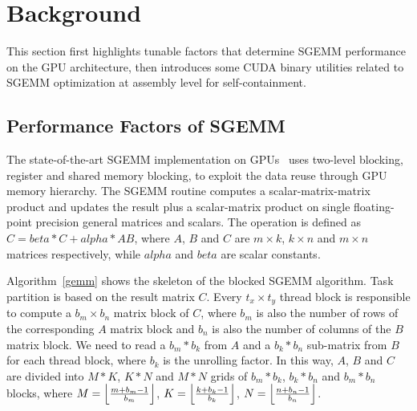 \section{Background}
\label{sec:background}

This section first highlights tunable factors that determine SGEMM performance on the GPU architecture, then introduces some CUDA binary utilities related to SGEMM optimization at assembly level for self-containment. 


\subsection{Performance Factors of SGEMM}
\label{sec:sgemm}
The state-of-the-art SGEMM implementation on GPUs~\cite{magma,nervana_sgemm_wiki,lai,tan} uses two-level blocking,
register and shared memory blocking, to exploit the data reuse through GPU memory hierarchy.
The SGEMM routine computes a scalar-matrix-matrix product and updates the result plus
a scalar-matrix product on single floating-point precision general matrices and scalars. 
The operation is defined as $C
= beta*C + alpha*AB$, where $A$, $B$ and $C$ are $m\times k$, $k\times n$ and
$m\times n$ matrices respectively, while $alpha$ and $beta$ are scalar constants.

Algorithm~\ref{gemm} shows the skeleton of the blocked SGEMM algorithm. 
Task partition is based on the result matrix $C$. 
Every $t_x \times t_y$ thread block is responsible to compute a $b_m \times b_n$ matrix block of $C$, where $b_m$ is also the number of rows of the corresponding $A$ matrix block and $b_n$ is also the  
number of columns of the $B$ matrix block. 
We need to read a $b_m*b_k$ from $A$ and a $b_k*b_n$ sub-matrix from 
$B$ for each thread block, where $b_k$ is the unrolling factor. In this way, $A$, $B$ and $C$ are divided into $M*K$, $K*N$ and 
$M*N$ grids of $b_m*b_k$, $b_k*b_n$ and $b_m*b_n$ blocks, where $M=\Bigl\lfloor \frac{m+b_m-1}{b_m} \Bigr\rfloor$, 
$K=\Bigl\lfloor \frac{k+b_k-1}{b_k} \Bigr\rfloor$, $N=\Bigl\lfloor \frac{n+b_n-1}{b_n} \Bigr\rfloor$.

